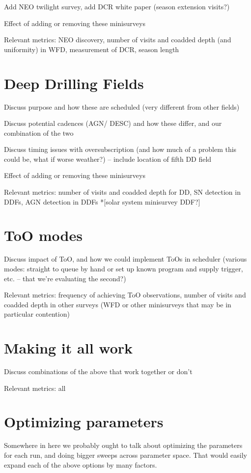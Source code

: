 Add NEO twilight survey, add DCR white paper (season extension visits?)

Effect of adding or removing these minisurveys

Relevant metrics: NEO discovery, number of visits and coadded depth (and uniformity) in WFD, measurement of DCR, season length

\section{Deep Drilling Fields}
Discuss purpose and how these are scheduled (very different from other fields)

Discuss potential cadences (AGN/ DESC) and how these differ, and our combination of the two

Discuss timing issues with oversubscription (and how much of a problem this could be, what if worse weather?) -- include location of fifth DD field

Effect of adding or removing these minisurveys

Relevant metrics: number of visits and coadded depth for DD, SN detection in DDFs, AGN detection in DDFs
*[solar system minisurvey DDF?]

\section{ToO modes}
Discuss impact of ToO, and how we could implement ToOs in scheduler (various modes: straight to queue by hand or set up known program and supply trigger, etc. -- that we're evaluating the second?)

Relevant metrics: frequency of achieving ToO observations, number of visits and coadded depth in other surveys (WFD or other minisurveys that may be in particular contention)

\section{Making it all work}
Discuss combinations of the above that work together or don't 

Relevant metrics: all

\section{Optimizing parameters}
Somewhere in here we probably ought to talk about optimizing the parameters for each run, and doing bigger sweeps across parameter space. That would easily expand each of the above options by many factors.

